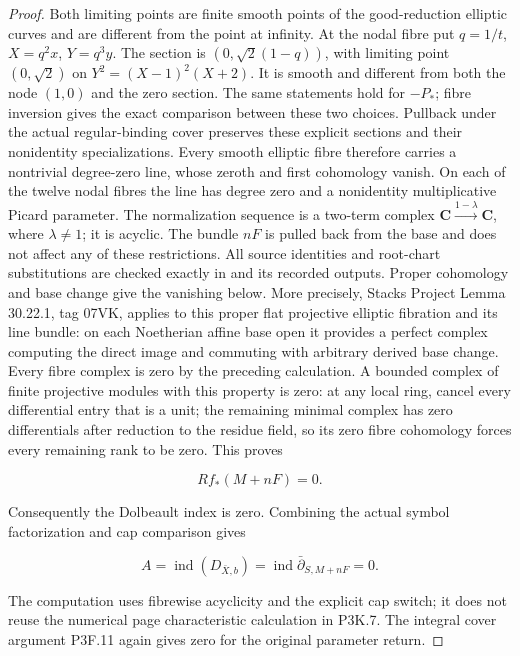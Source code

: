 \begin{proof}
Both limiting points are finite smooth points of the good-reduction
elliptic curves and are different from the point at infinity.
At the nodal fibre put \(q=1/t\), \(X=q^2x\), \(Y=q^3y\).
The section is \((0,\sqrt2(1-q))\), with limiting point
\((0,\sqrt2)\) on \(Y^2=(X-1)^2(X+2)\).  It is smooth and
different from both the node \((1,0)\) and the zero section.
The same statements hold for \(-P_*\); fibre inversion gives
the exact comparison between these two choices.  Pullback under
the actual regular-binding cover preserves these explicit
sections and their nonidentity specializations.  Every smooth
elliptic fibre therefore carries a nontrivial degree-zero line,
whose zeroth and first cohomology vanish.  On each of the twelve
nodal fibres the line has degree zero and a nonidentity
multiplicative Picard parameter.  The normalization sequence is
a two-term complex
\(\mathbf C\xrightarrow{1-\lambda}\mathbf C\), where
\(\lambda\ne1\); it is acyclic.  The bundle \(nF\) is pulled
back from the base and does not affect any of these restrictions.
All source identities and root-chart substitutions are checked
exactly in  and its recorded
outputs.
Proper cohomology and base change give the vanishing below.
More precisely, Stacks Project Lemma 30.22.1, tag 07VK,
applies to this proper flat projective elliptic fibration and
its line bundle: on each Noetherian affine base open it provides
a perfect complex computing the direct image and commuting with
arbitrary derived base change.  Every fibre complex is zero by
the preceding calculation.  A bounded complex of finite projective
modules with this property is zero: at any local ring, cancel
every differential entry that is a unit; the remaining minimal
complex has zero differentials after reduction to the residue
field, so its zero fibre cohomology forces every remaining rank
to be zero.  This proves

\[
 R f_*(M+nF)=0.
\]

Consequently the Dolbeault index is zero.  Combining the actual
symbol factorization and cap comparison gives

\[
 A=\operatorname{ind}(D_{\bar X,b})
  =\operatorname{ind}\bar\partial_{S,M+nF}=0.
\]

The computation uses fibrewise acyclicity and the explicit cap
switch; it does not reuse the numerical page characteristic
calculation in P3K.7.  The integral cover argument P3F.11 again
gives zero for the original parameter return.
\end{proof}

